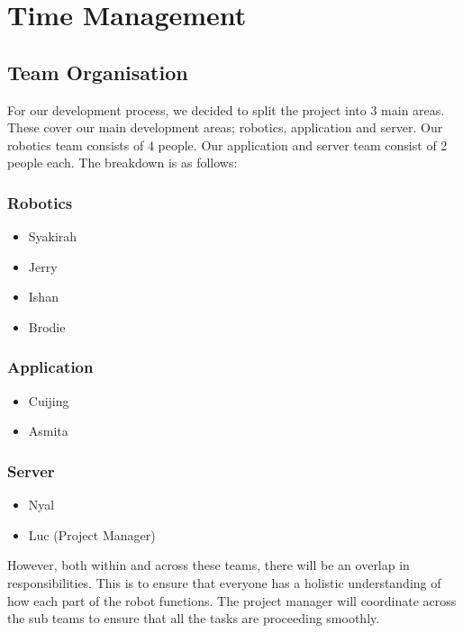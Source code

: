 \section{Time Management}
    \subsection{Team Organisation}
        For our development process, we decided to split the project into 3 main areas. These cover our main development areas; robotics, application and server. Our robotics team consists of 4 people. Our application and server team consist of 2 people each. The breakdown is as follows: \\

        \subsubsection{Robotics}
            \begin{itemize}
                \setlength{\itemindent}{.2in}
                \item Syakirah
                \item Jerry
                \item Ishan
                \item Brodie
            \end{itemize}

        \subsubsection{Application}
            \begin{itemize}
                \setlength{\itemindent}{.2in}
                \item Cuijing
                \item Asmita
            \end{itemize}
        \subsubsection{Server}
            \begin{itemize}
                \setlength{\itemindent}{.2in}
                \item Nyal
                \item Luc (Project Manager)
            \end{itemize}
            However, both within and across these teams, there will be an overlap in responsibilities. This is to ensure that everyone has a holistic understanding of how each part of the robot functions. The project manager will coordinate across the sub teams to ensure that all the tasks are proceeding smoothly.

